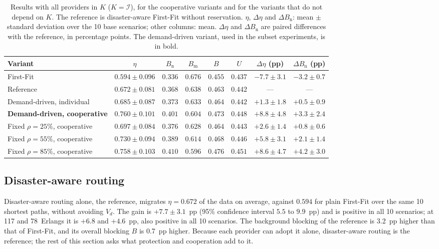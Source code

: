 \documentclass[11pt,a4paper]{article}
\theoremstyle{definition}
\begin{document}
\begin{table}[!t]
\centering
\small
\caption{Results with all providers in $K$ ($K=\mathcal{I}$), for the cooperative variants and for the variants that do not depend on $K$. The reference is disaster-aware First-Fit without reservation. $\eta$, $\Delta\eta$ and $\Delta B_\mathrm{n}$: mean $\pm$ standard deviation over the 10 base scenarios; other columns: mean. $\Delta\eta$ and $\Delta B_\mathrm{n}$ are paired differences with the reference, in percentage points. The demand-driven variant, used in the subset experiments, is in bold.}
\label{tab:main}
\setlength{\tabcolsep}{4.5pt}
\begin{tabular}{@{}lccccccc@{}}
\toprule
Variant & $\eta$ & $B_\mathrm{n}$ & $B_\mathrm{m}$ & $B$ & $U$ & $\Delta\eta$ (pp) & $\Delta B_\mathrm{n}$ (pp) \\
\midrule
First-Fit & $0.594\pm0.096$ & $0.336$ & $0.676$ & $0.455$ & $0.437$ & $-7.7\pm3.1$ & $-3.2\pm0.7$ \\
Reference & $0.672\pm0.081$ & $0.368$ & $0.638$ & $0.463$ & $0.442$ & --- & --- \\
\midrule
Demand-driven, individual & $0.685\pm0.087$ & $0.373$ & $0.633$ & $0.464$ & $0.442$ & $+1.3\pm1.8$ & $+0.5\pm0.9$ \\
\textbf{Demand-driven, cooperative} & $0.760\pm0.101$ & $0.401$ & $0.604$ & $0.473$ & $0.448$ & $+8.8\pm4.8$ & $+3.3\pm2.4$ \\
\midrule
Fixed $\rho=25\%$, cooperative & $0.697\pm0.084$ & $0.376$ & $0.628$ & $0.464$ & $0.443$ & $+2.6\pm1.4$ & $+0.8\pm0.6$ \\
Fixed $\rho=55\%$, cooperative & $0.730\pm0.094$ & $0.389$ & $0.614$ & $0.468$ & $0.446$ & $+5.8\pm3.1$ & $+2.1\pm1.4$ \\
Fixed $\rho=85\%$, cooperative & $0.758\pm0.103$ & $0.410$ & $0.596$ & $0.476$ & $0.451$ & $+8.6\pm4.7$ & $+4.2\pm3.0$ \\
\bottomrule
\end{tabular}
\end{table}

\subsection{Disaster-aware routing}

Disaster-aware routing alone, the reference, migrates $\eta=0.672$ of the data on average, against $0.594$ for plain First-Fit over the same 10 shortest paths, without avoiding $V_d$.
The gain is $+7.7\pm3.1$~pp (95\% confidence interval $5.5$ to $9.9$~pp) and is positive in all 10 scenarios; at 117 and 78~Erlangs it is $+6.8$ and $+4.6$~pp, also positive in all 10 scenarios.
The background blocking of the reference is 3.2~pp higher than that of First-Fit, and its overall blocking $B$ is 0.7~pp higher.
Because each provider can adopt it alone, disaster-aware routing is the reference; the rest of this section asks what protection and cooperation add to it.
\end{document}
